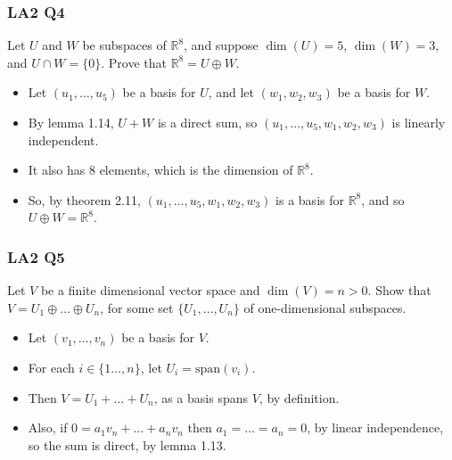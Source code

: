 \documentclass[handout]{beamer}
\newcommand{\bR}{\mathbb{R}}
\newcommand{\spa}{\mathrm{span}}
\begin{document}
\begin{frame}
\frametitle{LA2 Q4}
Let $U$ and $W$ be subspaces of $\bR^8$, and suppose $\dim(U) = 5$, $\dim(W)= 3$, and $U\cap W =\{0\}$. Prove that $\bR^8 = U\oplus W$.
\vspace{0.5cm}
\begin{itemize}
\item Let $(u_1,\ldots,u_5)$ be  a basis for $U$, and let $(w_1,w_2,w_3)$ be a basis for $W$. \vspace{0.2cm}
\item By lemma 1.14, $U+W$ is a direct sum, so $(u_1,\ldots,u_5,w_1,w_2,w_3)$ is linearly independent. \vspace{0.2cm}
\item It also has 8 elements, which is the dimension of $\bR^8$. \vspace{0.2cm}
\item So, by theorem 2.11, $(u_1,\ldots,u_5,w_1,w_2,w_3)$ is a basis for $\bR^8$, and so $U\oplus W = \bR^8$.
\end{itemize}
\end{frame}

\begin{frame}
\frametitle{LA2 Q5}
Let $V$ be a finite dimensional vector space and $\dim(V)= n>0$. Show that $V= U_1\oplus\ldots\oplus U_n$, for some set $\{U_1,\ldots,U_n\}$ of one-dimensional subspaces. 
\vspace{0.5cm}
\begin{itemize}
\item Let $(v_1,\ldots,v_n)$ be a basis for $V$. \vspace{0.3cm}
\item For each $i\in \{1\ldots,n\}$, let $U_i = \spa(v_i)$. \vspace{0.3cm}
\item Then $V=U_1+\ldots+ U_n$, as a basis spans $V$, by definition. \vspace{0.3cm}
\item Also, if $0 = a_1v_n+\ldots+a_nv_n$ then $a_1=\ldots= a_n = 0$, by linear independence, so the sum is direct, by lemma 1.13.
\end{itemize}
\end{frame}
\end{document}
